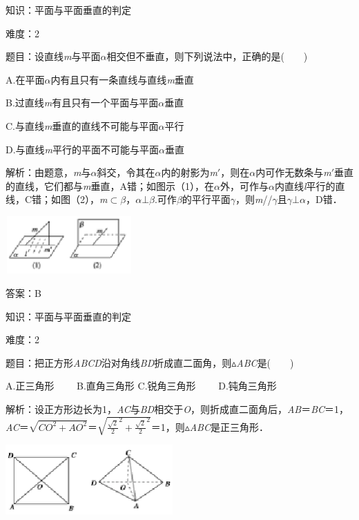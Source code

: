 \documentclass{article} %
\begin{document}
知识：平面与平面垂直的判定

难度：2

题目：设直线\textit{m}与平面\textit{$\alpha$}相交但不垂直，则下列说法中，正确的是(　　)

A.在平面\textit{$\alpha$}内有且只有一条直线与直线\textit{m}垂直

B.过直线\textit{m}有且只有一个平面与平面\textit{$\alpha$}垂直

C.与直线\textit{m}垂直的直线不可能与平面\textit{$\alpha$}平行

D.与直线\textit{m}平行的平面不可能与平面\textit{$\alpha$}垂直

解析：由题意，\textit{m}与\textit{$\alpha$}斜交，令其在\textit{$\alpha$}内的射影为\textit{m}$'$，则在\textit{$\alpha$}内可作无数条与\textit{m}$'$垂直的直线，它们都与\textit{m}垂直，A错；如图示（1），在\textit{$\alpha$}外，可作与\textit{$\alpha$}内直线\textit{l}平行的直线，C错；如图（2），\textit{m}$\mathrm{\subset }$\textit{$\beta$}，\textit{$\alpha$}$\mathrm{\bot}$\textit{$\beta$}.可作\textit{$\beta$}的平行平面\textit{$\gamma$}，则\textit{m}//\textit{$\gamma$}且\textit{$\gamma$}$\mathrm{\bot}$\textit{$\alpha$}，D错．

\includegraphics*[width=1.92in, height=0.87in, keepaspectratio=false]{image219}

答案：B

知识：平面与平面垂直的判定

难度：2

题目：把正方形\textit{ABCD}沿对角线\textit{BD}折成直二面角，则$\mathrm{\vartriangle}$\textit{ABC}是(　　)

A.正三角形　　 B.直角三角形 C.锐角三角形　　 D.钝角三角形

解析：设正方形边长为1，\textit{AC}与\textit{BD}相交于\textit{O}，则折成直二面角后，\textit{AB}＝\textit{BC}＝1，\textit{AC}＝$\sqrt{CO^2+AO^2}$＝$\sqrt{\frac{\sqrt{2}}{2}^2+\frac{\sqrt{2}}{2}^2}$＝1，则$\mathrm{\vartriangle}$\textit{ABC}是正三角形．

\includegraphics*[width=2.52in, height=1.05in, keepaspectratio=false]{image220}
\end{document}
